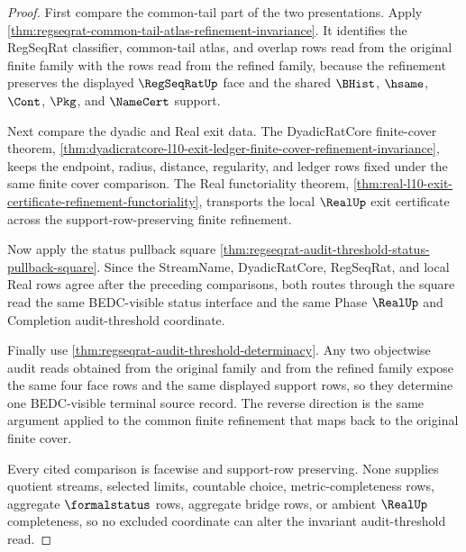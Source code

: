 \begin{proof}
First compare the common-tail part of the two presentations. Apply \autoref{thm:regseqrat-common-tail-atlas-refinement-invariance}. It identifies the RegSeqRat classifier, common-tail atlas, and overlap rows read from the original finite family with the rows read from the refined family, because the refinement preserves the displayed $\RegSeqRatUp$ face and the shared $\BHist$, $\hsame$, $\Cont$, $\Pkg$, and $\NameCert$ support.

Next compare the dyadic and Real exit data. The DyadicRatCore finite-cover theorem, \autoref{thm:dyadicratcore-l10-exit-ledger-finite-cover-refinement-invariance}, keeps the endpoint, radius, distance, regularity, and ledger rows fixed under the same finite cover comparison. The Real functoriality theorem, \autoref{thm:real-l10-exit-certificate-refinement-functoriality}, transports the local $\RealUp$ exit certificate across the support-row-preserving finite refinement.

Now apply the status pullback square \autoref{thm:regseqrat-audit-threshold-status-pullback-square}. Since the StreamName, DyadicRatCore, RegSeqRat, and local Real rows agree after the preceding comparisons, both routes through the square read the same BEDC-visible status interface and the same Phase $\RealUp$ and Completion audit-threshold coordinate.

Finally use \autoref{thm:regseqrat-audit-threshold-determinacy}. Any two objectwise audit reads obtained from the original family and from the refined family expose the same four face rows and the same displayed support rows, so they determine one BEDC-visible terminal source record. The reverse direction is the same argument applied to the common finite refinement that maps back to the original finite cover.

Every cited comparison is facewise and support-row preserving. None supplies quotient streams, selected limits, countable choice, metric-completeness rows, aggregate $\formalstatus$ rows, aggregate bridge rows, or ambient $\RealUp$ completeness, so no excluded coordinate can alter the invariant audit-threshold read.
\end{proof}

